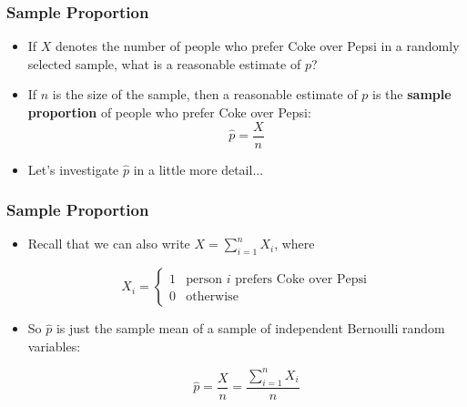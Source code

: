 \documentclass[14pt]{beamer}
\begin{document}
\begin{frame}
	\frametitle{Sample Proportion}
	
	\begin{itemize}[label={\color{blue}$\blacktriangleright$}]
		\item If $X$ denotes the number of people who prefer Coke over Pepsi in a randomly selected sample, what is a reasonable estimate of $p$?
		\item If $n$ is the size of the sample, then a reasonable estimate of $p$ is the {\bf sample proportion} of people who prefer Coke over Pepsi:
		$$\hat{p}=\frac{X}{n}$$
		\item Let's investigate $\hat{p}$ in a little more detail...
	\end{itemize}
\end{frame}
\begin{frame}
	\frametitle{Sample Proportion}
	
	\begin{itemize}[label={\color{blue}$\blacktriangleright$}]
		\item Recall that we can also write $X = \sum_{i=1}^n X_i$, where
		
		\[
		X_i = \begin{cases}
			1 & \text{person $i$ prefers Coke over Pepsi} \\
			0 & \text{otherwise}
		\end{cases}
		\]
		
		\item So $\hat{p}$ is just the sample mean of a sample of independent Bernoulli random variables:
		
		\[
		\hat{p} = \frac{X}{n} = \frac{\sum_{i=1}^n X_i}{n}
		\]
	\end{itemize}
	
\end{frame}
\end{document}
